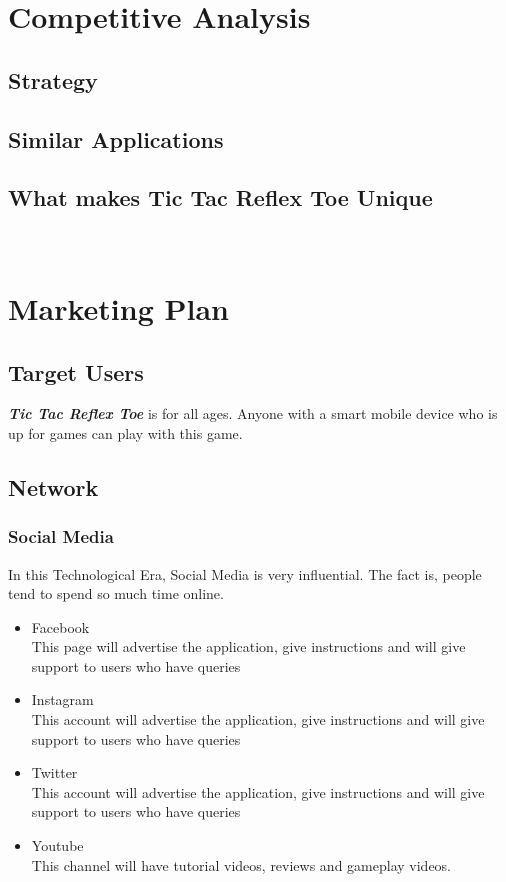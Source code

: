 \documentclass{article}
\begin{document}
\section{Competitive Analysis}
\subsection{Strategy}
\subsection{Similar Applications}
\subsection{What makes Tic Tac Reflex Toe Unique}

~\newline
\section{Marketing Plan}
\subsection{Target Users}
    \textbf{\emph{Tic Tac Reflex Toe}} is for all ages.  Anyone with a smart mobile device who is up for games can play with this game.
\subsection{Network}
    \subsubsection{Social Media}
        In this Technological Era, Social Media is very influential.  The fact is, people tend to spend so much time online.  
        \newline
        \begin{itemize}
        	\item Facebook\\This page will advertise the application, give instructions and will give support to users who have queries
        	\item Instagram\\This account will advertise the application, give instructions and will give support to users who have queries
        	\item Twitter\\This account will advertise the application, give instructions and will give support to users who have queries
        	\item Youtube\\This channel will have tutorial videos, reviews and gameplay videos.
        \end{itemize}
    
\end{document}
